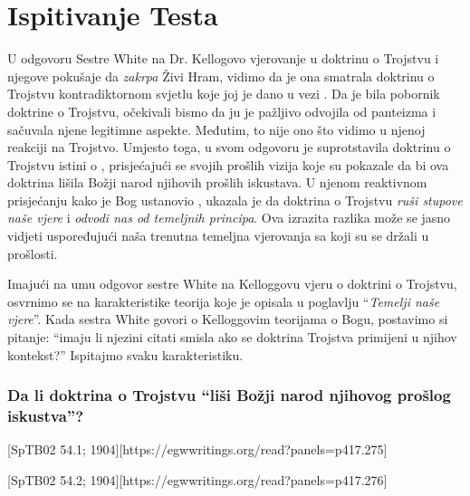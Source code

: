 \chapter{Ispitivanje Testa}

U odgovoru Sestre White na Dr. Kellogovo vjerovanje u doktrinu o Trojstvu i njegove pokušaje da \textit{zakrpa} Živi Hram, vidimo da je ona smatrala doktrinu o Trojstvu kontradiktornom svjetlu koje joj je dano u vezi . Da je bila pobornik doktrine o Trojstvu, očekivali bismo da ju je pažljivo odvojila od panteizma i sačuvala njene legitimne aspekte. Međutim, to nije ono što vidimo u njenoj reakciji na Trojstvo. Umjesto toga, u svom odgovoru je suprotstavila doktrinu o Trojstvu istini o , prisjećajući se svojih prošlih vizija koje su pokazale da bi ova doktrina lišila Božji narod njihovih prošlih iskustava. U njenom reaktivnom prisjećanju kako je Bog ustanovio , ukazala je da doktrina o Trojstvu \textit{ruši stupove naše vjere} i \textit{odvodi nas od temeljnih principa}. Ova izrazita razlika može se jasno vidjeti uspoređujući naša trenutna temeljna vjerovanja sa  koji su se držali u prošlosti.

Imajući na umu odgovor sestre White na Kelloggovu vjeru o doktrini o Trojstvu, osvrnimo se na karakteristike teorija koje je opisala u poglavlju “\textit{Temelji naše vjere}”. Kada sestra White govori o Kelloggovim teorijama o Bogu, postavimo si pitanje: “imaju li njezini citati smisla ako se doktrina Trojstva primijeni u njihov kontekst?” Ispitajmo svaku karakteristiku.

\subsection*{Da li doktrina o Trojstvu “liši Božji narod njihovog prošlog iskustva”?}

[SpTB02 54.1; 1904][https://egwwritings.org/read?panels=p417.275]

[SpTB02 54.2; 1904][https://egwwritings.org/read?panels=p417.276]

